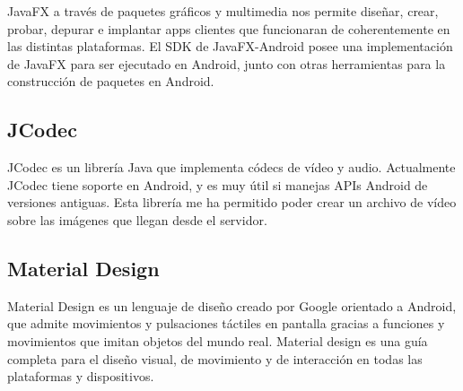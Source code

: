 JavaFX a través de paquetes gráficos y multimedia nos permite diseñar, crear, probar, depurar e implantar apps clientes que funcionaran de coherentemente en las distintas plataformas. El SDK de JavaFX-Android posee una implementación de JavaFX para ser ejecutado en Android, junto con otras herramientas para la construcción de paquetes en Android.

\subsection{JCodec}

JCodec es un librería Java que implementa códecs de vídeo y audio. Actualmente JCodec tiene soporte en Android, y es muy útil si manejas APIs Android de versiones antiguas. Esta librería me ha permitido poder crear un archivo de vídeo sobre las imágenes que llegan desde el servidor.

\subsection{Material Design}

Material Design es un lenguaje de diseño creado por Google orientado a Android, que admite movimientos y pulsaciones táctiles en pantalla gracias a funciones y movimientos que imitan objetos del mundo real. Material design es una guía completa para el diseño visual, de movimiento y de interacción en todas las plataformas y dispositivos.



